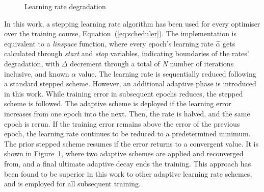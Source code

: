\begin{figure}[ht]
    \centering
    
    \caption{Learning rate degradation}
    \label{fig:l_rate_progress}
\end{figure}
In this work, a stepping learning rate algorithm has been used for every optimiser over the training course, Equation~(\ref{eq:scheduler}).
The implementation is equivalent to a \textit{linspace} function, where every epoch's learning rate $\hat{\alpha}$ gets calculated through \textit{start} and \textit{stop} variables, indicating boundaries of the rates' degradation, with $\Delta$ decrement through a total of \textit{N} number of iterations inclusive, and known $\alpha$ value.
%
The learning rate is sequentially reduced following a standard stepped scheme.
However, an additional adaptive phase is introduced in this work.
While training error in subsequent epochs reduces, the stepped scheme is followed.
The adaptive scheme is deployed if the learning error increases from one epoch into the next.
Then, the rate is halved, and the same epoch is rerun.
If the training error remains above the error of the previous epoch, the learning rate continues to be reduced to a predetermined minimum.
The prior stepped scheme resumes if the error returns to a convergent value.
It is shown in Figure~\ref{fig:l_rate_progress}, where two adaptive schemes are applied and reconverged from, and a final ultimate adaptive decay ends the training.
%
This approach has been found to be superior in this work to other adaptive learning rate schemes, and is employed for all subsequent training.
%
